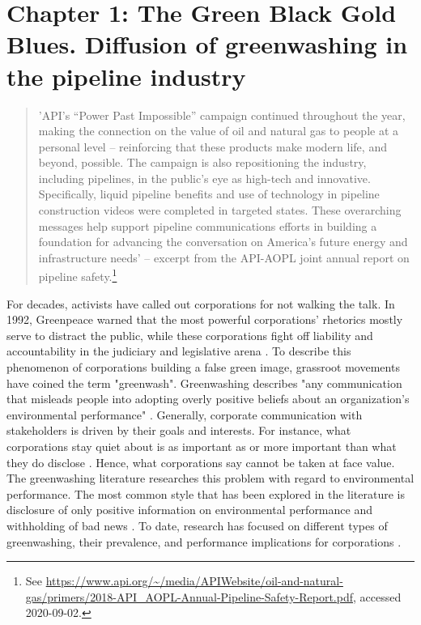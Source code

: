 \section{Chapter 1: The Green Black Gold Blues. Diffusion of greenwashing in the pipeline industry}

\begin{quote}
	'API’s “Power Past Impossible” campaign continued throughout the year, making the connection on the value of oil and natural gas to people at a personal level – reinforcing that these products make modern life, and beyond, possible.  The campaign is also repositioning the industry, including pipelines, in the public’s eye as high-tech and innovative. Specifically, liquid pipeline benefits and use of technology in pipeline construction videos were completed in targeted states. These overarching messages help support pipeline communications efforts in building a foundation for advancing the conversation on America’s future energy and infrastructure needs' -- excerpt from the API-AOPL joint annual report on pipeline safety.\footnote{See \url{https://www.api.org/~/media/APIWebsite/oil-and-natural-gas/primers/2018-API_AOPL-Annual-Pipeline-Safety-Report.pdf}, accessed 2020-09-02.}
\end{quote}

For decades, activists have called out corporations for not walking the talk. In 1992, Greenpeace warned that the most powerful corporations' rhetorics mostly serve to distract the public, while these corporations fight off liability and accountability in the judiciary and legislative arena \citep{Bruno1992}. To describe this phenomenon of corporations building a false green image, grassroot movements have coined the term "greenwash". Greenwashing describes "any communication that misleads people into adopting overly positive beliefs about an organization's environmental performance" \citep[p. 225]{Lyon2015}. Generally, corporate communication with stakeholders is driven by their goals and interests. For instance, what corporations stay quiet about is as important as or more important than what they do disclose \citep{Kim2015}. Hence, what corporations say cannot be taken at face value. The greenwashing literature researches this problem with regard to environmental performance. The most common style that has been explored in the literature is disclosure of only positive information on environmental performance and withholding of bad news \citep{Lyon2011}. To date, research has focused on different types of greenwashing, their prevalence, and performance implications for corporations \citep{Marquis2016, Ramus2005, Seele2017, Kassinis2018}.


